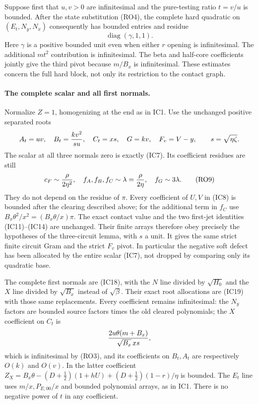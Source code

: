 Suppose first that $u,v>0$ are infinitesimal and the pure-testing
ratio $t=v/u$ is bounded. After the state substitution (RO4), the
complete hard quadratic on $(E_t,N_y,N_x)$ consequently has bounded
entries and residue
\[
                         \operatorname{diag}(\gamma,1,1).       \tag{RO8}
\]
Here $\gamma$ is a positive bounded unit even when either $r$
opening is infinitesimal. The additional $m t^2$ contribution is
infinitesimal. The beta and half-core coefficients jointly give the
third pivot because $m/B_x$ is infinitesimal. These estimates concern
the full hard block, not only its restriction to the contact graph.

\paragraph{The complete scalar and all first normals.}
Normalize $Z=1$, homogenizing at the end as in IC1. Use the unchanged
positive separated roots
\[
 A_t=uv,\quad B_t={kv^2\over s u},\quad C_t=xs,\quad
 G=kv,\quad F_v=V-y,\qquad s=\sqrt{\eta\zeta}.
\]
The scalar at all three normals zero is exactly (IC7). Its coefficient
residues are still
\[
 c_F\sim{\rho\over2\eta^2},\quad
 f_A,f_B,f_C\sim\lambda={\rho\over2\eta},\quad
 f_G\sim3\lambda.                                   \tag{RO9}
\]
They do not depend on the residue of $\pi$. Every coefficient of
$U,V$ in (IC8) is bounded after the clearing described above;
for the additional term in $f_C$ use
$B_x\theta^2/x^2=(B_x\theta/x)\pi$. The exact contact
value and the two first-jet identities (IC11)--(IC14) are unchanged.
Their finite arrays therefore obey precisely the hypotheses of the
three-circuit lemma, with $s$ a unit. It gives the same strict finite
circuit Gram and the strict $F_v$ pivot. In particular the negative
soft defect has been allocated by the entire scalar (IC7), not
dropped by comparing only its quadratic base.

The complete first normals are (IC18), with the $N$ line divided
by $\sqrt{H_0}$ and the $X$ line divided by $\sqrt{B_x}$
instead of $\sqrt\beta$. Their exact root allocations are (IC19)
with those same replacements. Every coefficient remains infinitesimal:
the $N_y$ factors are bounded source factors times the old cleared
polynomials; the $X$ coefficient on $C_t$ is
\[
 {2u\theta(m+B_x)\over\sqrt{B_x}\,xs},
\]
which is infinitesimal by (RO3), and its coefficients on $B_t,A_t$
are respectively $O(k)$ and $O(v)$. In the latter coefficient
$Z_X=B_x\theta-(D+\tfrac12)(1+hU)
 +(D+\tfrac12)(1-r)/\eta$ is bounded. The $E_t$ line uses
$m/x,P_{E,00}/x$ and bounded polynomial arrays, as in IC1.
There is no negative power of $t$ in any coefficient.

